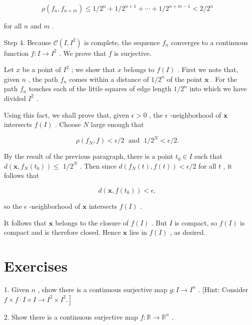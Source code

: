 \[
\rho \left( {{f}_{n},{f}_{n + m}}\right)  \leq  1/{2}^{n} + 1/{2}^{n + 1} + \cdots  + 1/{2}^{n + m - 1} < 2/{2}^{n}
\]

for all \(n\) and \(m\) .

Step 4. Because \(\mathcal{C}\left( {I,{I}^{2}}\right)\) is complete, the sequence \({f}_{n}\) converges to a continuous function \(f : I \rightarrow  {I}^{2}\) . We prove that \(f\) is surjective.

Let \(x\) be a point of \({I}^{2}\) ; we show that \(x\) belongs to \(f\left( I\right)\) . First we note that, given \(n\) , the path \({f}_{n}\) comes within a distance of \(1/{2}^{n}\) of the point \(\mathbf{x}\) . For the path \({f}_{n}\) touches each of the little squares of edge length \(1/{2}^{n}\) into which we have divided \({I}^{2}\) .

Using this fact, we shall prove that, given \(\epsilon  > 0\) , the \(\epsilon\) -neighborhood of \(\mathbf{x}\) intersects \(f\left( I\right)\) . Choose \(N\) large enough that

\[
\rho \left( {{f}_{N},f}\right)  < \epsilon /2\;\text{ and }\;1/{2}^{N} < \epsilon /2.
\]

By the result of the previous paragraph, there is a point \({t}_{0} \in  I\) such that \(d\left( {\mathbf{x},{f}_{N}\left( {t}_{0}\right) }\right)  \leq\)  \(1/{2}^{N}\) . Then since \(d\left( {{f}_{N}\left( t\right) ,f\left( t\right) }\right)  < \epsilon /2\) for all \(t\) , it follows that

\[
d\left( {\mathbf{x},f\left( {t}_{0}\right) }\right)  < \epsilon ,
\]

so the \(\epsilon\) -neighborhood of \(\mathbf{x}\) intersects \(f\left( I\right)\) .

It follows that \(\mathbf{x}\) belongs to the closure of \(f\left( I\right)\) . But \(I\) is compact, so \(f\left( I\right)\) is compact and is therefore closed. Hence \(\mathbf{x}\) lies in \(f\left( I\right)\) , as desired.

\section*{Exercises}

1. Given \(n\) , show there is a continuous surjective map \(g : I \rightarrow  {I}^{n}\) . [Hint: Consider \(\left. {f \times  f \cdot  I \times  I \rightarrow  {I}^{2} \times  {I}^{2}.}\right\rbrack\)

2. Show there is a continuous surjective map \(f : \mathbb{R} \rightarrow  {\mathbb{R}}^{n}\) .

